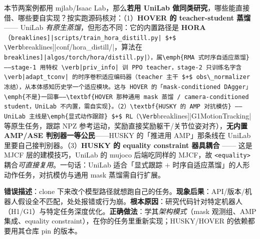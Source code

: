 \begin{note}
本节两案例都用 mjlab/Isaac Lab，那么\textbf{若用 UniLab 做同类研究}，哪些能直接借、哪些要自实现？按实跑源码核对：（1）\textbf{HOVER 的 teacher-student 蒸馏} —— UniLab \emph{有原生蒸馏}，但形态不同：它的内置路径是 \textbf{HORA}（\Verb[breaklines]|scripts/train_hora_distill.py| $+$ \Verb[breaklines]|conf/hora_distill/|，算法在 \Verb[breaklines]|algos/torch/hora/distill.py|），属\emph{RMA 式时序自适应蒸馏}——stage-1 用特权 \verb|priv_info| 训 PPO teacher，stage-2 只训练名字含 \verb|adapt_tconv| 的时序卷积适应编码器（teacher 主干 $+$ obs\_normalizer 冻结），从本体感知历史学一个适应模块。这与 HOVER 的「mask-conditioned DAgger」\emph{不是}一回事——\textbf{HOVER 那种通用 mask 蒸馏 / camera-conditioned student，UniLab 不内置，需自实现}。（2）\textbf{HUSKY 的 AMP 对抗模仿} —— UniLab 主线是\emph{显式动作跟踪} $+$ RL（\Verb[breaklines]|G1MotionTracking| 等原生任务，跟踪 NPZ 参考运动，奖励直接奖励躯干/关节位姿对齐），\textbf{无内置 AMP/ASE 判别器一等公民}——HUSKY 的「推进用 AMP」那条线在 UniLab 里要自己接判别器。（3）\textbf{HUSKY 的 equality constraint 器具耦合} —— 这是 MJCF 层的建模技巧，UniLab 的 mujoco 后端吃同样的 MJCF，故 \verb|<equality>| 耦合\emph{可直接复用}。一句话：UniLab 适合「显式跟踪 $+$ 时序自适应蒸馏」的人形动作任务，对抗模仿与通用 mask 蒸馏需自行扩展。
\end{note}

\begin{pitfall}
\textbf{错误描述}：clone 下来改个模型路径就想跑自己的任务。\textbf{现象后果}：API/版本/机器人假设全不匹配，处处报错或行为崩。\textbf{根本原因}：研究代码针对特定机器人（H1/G1）与特定任务深度优化。\textbf{正确做法}：学其\emph{架构模式}（mask 观测组、AMP 集成、equality constraint），在你的任务里重新实现；HUSKY/HOVER 的依赖都要用其仓库 pin 的版本。
\end{pitfall}

\begin{practice}[案例精读]
\end{practice}


